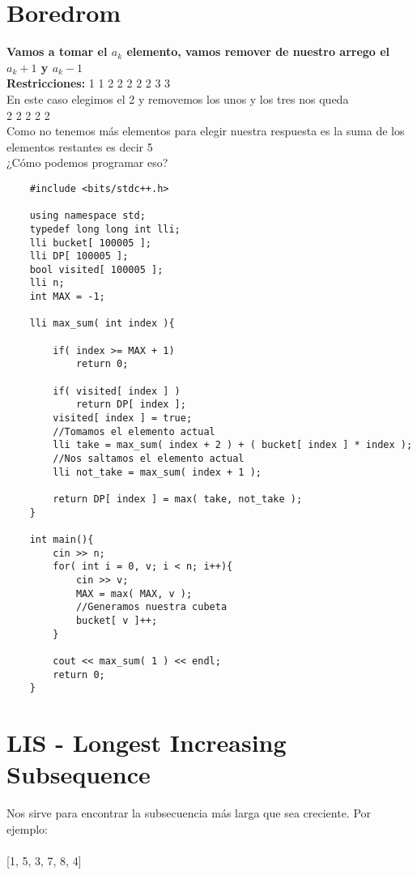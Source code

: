 \section{Boredrom}
\textbf{Vamos a tomar el $a_{k}$ elemento, vamos remover de nuestro arrego el $a_{k} + 1$ y $a_{k} - 1$ }\\
\textbf{Restricciones: }
1 1 2 2 2 2 2 3 3 \\
En este caso elegimos el 2 y removemos los unos y los tres nos queda \\
2 2 2 2 2 \\ 
Como no tenemos más elementos para elegir nuestra respuesta es la suma de los elementos restantes es decir 5 \\
¿Cómo podemos programar eso?
\begin{lstlisting}
    #include <bits/stdc++.h>

    using namespace std;
    typedef long long int lli;
    lli bucket[ 100005 ];
    lli DP[ 100005 ];
    bool visited[ 100005 ];
    lli n;
    int MAX = -1;
    
    lli max_sum( int index ){
    
        if( index >= MAX + 1)
            return 0;
        
        if( visited[ index ] )
            return DP[ index ];
        visited[ index ] = true;
        //Tomamos el elemento actual
        lli take = max_sum( index + 2 ) + ( bucket[ index ] * index );
        //Nos saltamos el elemento actual
        lli not_take = max_sum( index + 1 );
    
        return DP[ index ] = max( take, not_take );
    }
    
    int main(){
        cin >> n;
        for( int i = 0, v; i < n; i++){
            cin >> v;
            MAX = max( MAX, v );
            //Generamos nuestra cubeta
            bucket[ v ]++;
        }
        
        cout << max_sum( 1 ) << endl;
        return 0;
    }
\end{lstlisting}

\section{LIS - Longest Increasing Subsequence}
Nos sirve para encontrar la subsecuencia más larga que sea creciente. Por ejemplo:\\\\

[1, 5, 3, 7, 8, 4]\\\\

